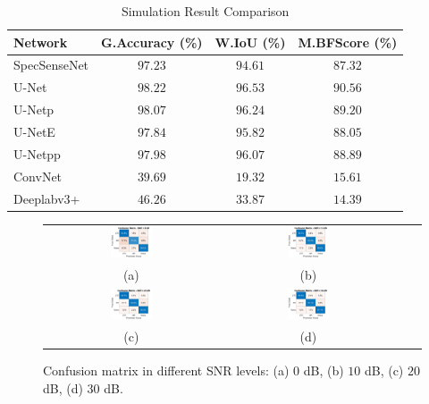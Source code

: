 \documentclass[conference]{IEEEtran} %
\begin{document}
\begin{table}[!t]
\centering
\caption{Simulation Result Comparison}
\label{tab3}
\begin{tabular}{l|c|c|c}
\hline
\textbf{Network}  & \textbf{G.Accuracy (\%)} & \textbf{W.IoU (\%)} & \textbf{M.BFScore (\%)} \\
\hline
SpecSenseNet  & $97.23$  & $94.61$ & $87.32$  \\
U-Net  \cite{ronneberger2015u} & $98.22$   &  $96.53$ & $90.56$ \\
U-Netp  \cite{zhou2019unet++} & $98.07$   &  $96.24$ & $89.20$ \\
U-NetE  \cite{zhou2019unet++} & $97.84$   & $95.82$  & $88.05$ \\
U-Netpp \cite{zhou2019unet++}   & $97.98$   & $96.07$ & $88.89$ \\
ConvNet \cite{huynhthe2023intelligence}   & $39.69$  & $19.32$ & $15.61$ \\
Deeplabv3+ \cite{nguyen2023accurate}  & $46.26$  &  $33.87$ & $14.39$ \\
\hline
\end{tabular}
\end{table}
\begin{figure}[!t]
    \centering
    \footnotesize
    \begin{tabular}{cccc}
        \includegraphics[width=0.25\textwidth]{img/confusion_matrix_0dB.jpg} & 
        \includegraphics[width=0.25\textwidth]{img/confusion_matrix_10dB.jpg} & \\ (a) & (b) \\
        \includegraphics[width=0.25\textwidth]{img/confusion_matrix_20dB.jpg} & 
        \includegraphics[width=0.25\textwidth]{img/confusion_matrix_30dB.jpg} & \\ (c) & (d)
    \end{tabular}
    \caption{Confusion matrix in different SNR levels: (a) $0$ dB, (b) $10$ dB, (c) $20$ dB, (d) $30$ dB.}
    \label{fig5}
\end{figure}
\end{document}
